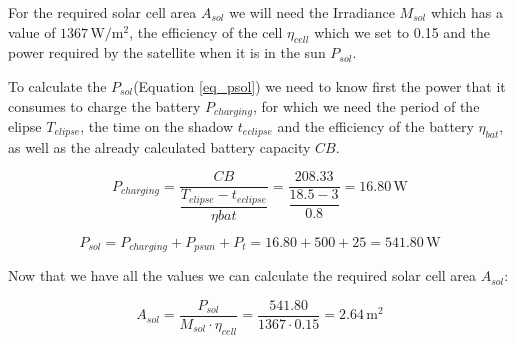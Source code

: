 \documentclass[a4paper,12pt,calibri,oneside,openany]{book}
\newcommand{\unit}[1]{\ensuremath{\, \mathrm{#1}}}
\theoremstyle{break}
\begin{document}
		For the required solar cell area $A_{sol}$ we will need the Irradiance $M_{sol}$ which has a value of $1367 \unit{W/m^{2}}$, the efficiency of the cell $\eta_{cell}$ which we set to 0.15 and the power required by the satellite when it is in the sun $P_{sol}$.
		
		To calculate the $P_{sol}$(Equation \ref{eq_psol}) we need to know first the power that it consumes to charge the battery $P_{charging}$, for which we need the period of the elipse $T_{elipse}$, the time on the shadow $t_{eclipse}$ and the efficiency of the battery $\eta_{bat}$, as well as the already calculated battery capacity $CB$.
		
		\begin{equation} \label{eq_pcharging}
			P_{charging} = \dfrac{CB}{\dfrac{T_{elipse}-t_{eclipse}} {\eta{bat}}	} =
			\dfrac{208.33}{\dfrac{18.5-3}{0.8}	} = 16.80 \unit{W}
		\end{equation}
		
		\begin{equation} \label{eq_psol}
			P_{sol} = P_{charging} + P_{psun} + P_{t}= 
			16.80 + 500 + 25= 541.80 \unit{W}
		\end{equation}
		
		Now that we have all the values we can calculate the required solar cell area $A_{sol}$:
		
		\begin{equation} \label{eq_asol}
			A_{sol} = \dfrac{P_{sol}}{M_{sol} \cdot \eta_{cell}}= \dfrac{541.80}{1367 \cdot 0.15}=  2.64 \unit{m^{2}}
		\end{equation}
		
	
	







	




%
\listoffigures

%

\end{document}
